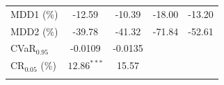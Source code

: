 \documentclass[pdf,10pt,xcolor=dvipsnames,hide notes]{beamer}
\begin{document}
\begin{frame}
\begin{threeparttable}[H]
\begin{tabularx}{\textwidth}{@{\extracolsep{\fill}}lcccc@{}}
			MDD1 (\%) & -12.59 & -10.39 & -18.00 & -13.20 \\
			MDD2 (\%) & -39.78 & -41.32 & -71.84 & -52.61 \\
			CVaR$_{0.95}$ & -0.0109 & -0.0135 &  & \\
			CR$_{0.05}$ (\%) & $12.86^{***}$ & 15.57 &  &  \\
			\bottomrule &  &  &  &
		\end{tabularx}%
		\label{tab:table02}%
	\end{threeparttable}

	
\end{frame}
\end{document}
